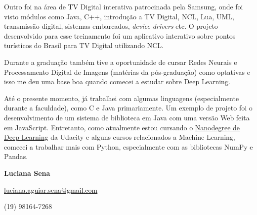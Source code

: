 \documentclass[11pt, a4paper]{article}
\begin{document}
Outro foi na área de TV Digital interativa patrocinada pela Samsung, onde foi visto módulos como Java, C++, introdução a TV Digital, NCL, Lua, UML, transmissão digital, sistemas embarcados, \textit{device drivers} etc. O projeto desenvolvido para esse treinamento foi um aplicativo interativo sobre pontos turísticos do Brasil para TV Digital utilizando NCL.

Durante a graduação também tive a oportunidade de cursar Redes Neurais e Processamento Digital de Imagens (matérias da pós-graduação) como optativas e isso me deu uma base boa quando comecei a estudar sobre Deep Learning. 

Até o presente momento, já trabalhei com algumas linguagens (especialmente durante a faculdade), como C e Java primariamente. Um exemplo de projeto foi o desenvolvimento de um sistema de biblioteca em Java com uma versão Web feita em JavaScript. Entretanto, como atualmente estou cursando o \href{https://br.udacity.com/course/deep-learning-nanodegree-foundation--nd101}{Nanodegree de Deep Learning} da Udacity e alguns cursos relacionados a Machine Learning, comecei a trabalhar mais com Python, especialmente com as bibliotecas NumPy e Pandas. 

\begin{center}
\textbf{\small{Luciana Sena}}

\href{mailto:luciana.aguiar.sena@gmail.com}{\footnotesize luciana.aguiar.sena@gmail.com}

\footnotesize{(19) 98164-7268}
\end{center}
\end{document}
